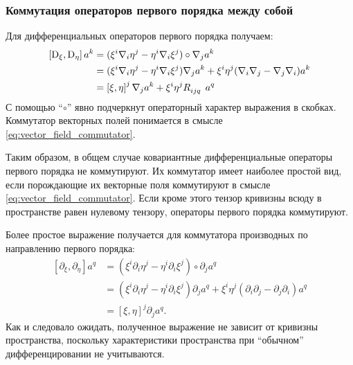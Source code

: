 \documentclass[12pt,a4paper]{article}
\begin{document}
        \subsubsection{Коммутация операторов первого порядка между собой}

            Для дифференциальных операторов первого порядка получаем:
            \begin{equation}\begin{aligned}
                \left[ \operatorname{D}_\xi, \operatorname{D}_\eta \right] a^k
                    &= (\xi^i \nabla_i \eta^j - \eta^i \nabla_i \xi^j) \circ \nabla_j a^k \\
                    &= (\xi^i \nabla_i \eta^j - \eta^i \nabla_i \xi^j) \nabla_j a^k
                        + \xi^i \eta^j (\nabla_i \nabla_j - \nabla_j \nabla_i) a^k \\
                    &= \left[ \xi, \eta \right]^j \nabla_j a^k
                        + \xi^i \eta^j R_{ijq}^{\hphantom{ijqk}} a^q
            \end{aligned}\end{equation}
            С помощью \enquote{$\circ$} явно подчеркнут операторный характер выражения в скобках. Коммутатор векторных полей понимается в смысле \autoref{eq:vector_field_commutator}.

            Таким образом, в общем случае ковариантные дифференциальные операторы первого порядка не коммутируют. Их коммутатор имеет наиболее простой вид, если порождающие их векторные поля коммутируют в смысле \autoref{eq:vector_field_commutator}. Если кроме этого тензор кривизны всюду в пространстве равен нулевому тензору, операторы первого порядка коммутируют.

            Более простое выражение получается для коммутатора производных по направлению первого порядка:
            \begin{equation}\begin{aligned}
                \left[ \partial_\xi, \partial_\eta \right] a^q
                    &= (\xi^i \partial_i \eta^j - \eta^i \partial_i \xi^j) \circ \partial_j a^q \\
                    &= (\xi^i \partial_i \eta^j - \eta^i \partial_i \xi^j) \partial_j a^q
                        + \xi^i \eta^j (\partial_i \partial_j - \partial_j \partial_i) a^q \\
                    &= \left[ \xi, \eta \right]^j \partial_j a^q .
            \end{aligned}\end{equation}
            Как и следовало ожидать, полученное выражение не зависит от кривизны пространства, поскольку характеристики пространства при \enquote{обычном} дифференцировании не учитываются.
\end{document}
